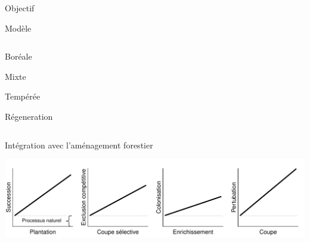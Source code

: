 \documentclass[11pt, compress, aspectratio=1610]{beamer}
\providecommand{\tightlist}{%
  \setlength{\itemsep}{0pt}\setlength{\parskip}{0pt}}
\newcommand{\begincols}{\begin{columns}}
\newcommand{\stopcols}{\end{columns}}
\begin{document}
\begin{frame}{Objectif}
\begin{center}
\end{center}

\end{frame}

\begin{frame}{Modèle}

\begincols
{} 
\hfill{}

\begin{description}
\tightlist
\item[B]
Boréale
\item[M]
Mixte
\item[T]
Tempérée
\item[R]
Régeneration
\end{description}

\stopcols

\end{frame}

\begin{frame}{Intégration avec l'aménagement forestier}

\centering
 \includegraphics[scale=0.65]{figures/managMechanism.pdf}\par

\end{frame}
\end{document}
